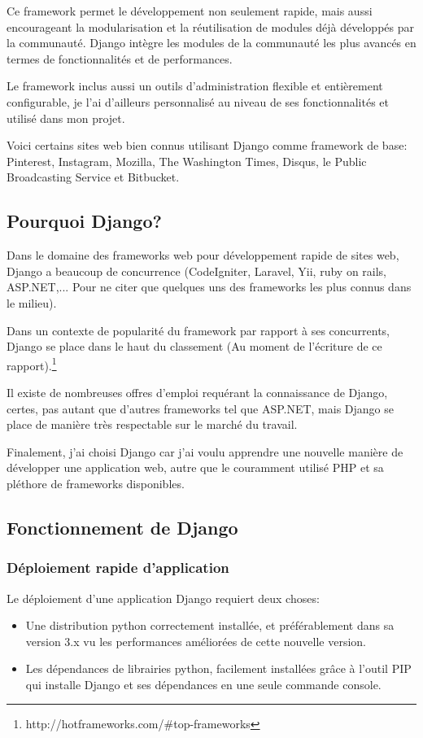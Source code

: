 \documentclass[12pt,table,a4paper]{report}
\begin{document}
Ce framework permet le développement non seulement rapide, mais aussi encourageant la modularisation et la réutilisation de modules déjà développés par la communauté. Django intègre les modules de la communauté les plus avancés en termes de fonctionnalités et de performances.

Le framework inclus aussi un outils d'administration flexible et entièrement configurable, je l'ai d'ailleurs personnalisé au niveau de ses fonctionnalités et utilisé dans mon projet.

Voici certains sites web bien connus utilisant Django comme framework de base: Pinterest, Instagram, Mozilla, The Washington Times, Disqus, le Public Broadcasting Service et Bitbucket. 

\subsection{Pourquoi Django?}

Dans le domaine des frameworks web pour développement rapide de sites web, Django a beaucoup de concurrence (CodeIgniter, Laravel, Yii, ruby on rails, ASP.NET,... Pour ne citer que quelques uns des frameworks les plus connus dans le milieu).

Dans un contexte de popularité du framework par rapport à ses concurrents, Django se place dans le haut du classement (Au moment de l'écriture de ce rapport).\footnote{http://hotframeworks.com/\#top-frameworks}

Il existe de nombreuses offres d'emploi requérant la connaissance de Django, certes, pas autant que d'autres frameworks tel que ASP.NET, mais Django se place de manière très respectable sur le marché du travail.

Finalement, j'ai choisi Django car j'ai voulu apprendre une nouvelle manière de développer une application web, autre que le couramment utilisé PHP et sa pléthore de frameworks disponibles.

\subsection{Fonctionnement de Django}
\subsubsection{Déploiement rapide d'application}
Le déploiement d'une application Django requiert deux choses:

\begin{itemize}
	\item{Une distribution python correctement installée, et préférablement dans sa version 3.x vu les performances améliorées de cette nouvelle version.}
	\item{Les dépendances de librairies python, facilement installées grâce à l'outil PIP qui installe Django et ses dépendances en une seule commande console.}
\end{itemize}
\end{document}
